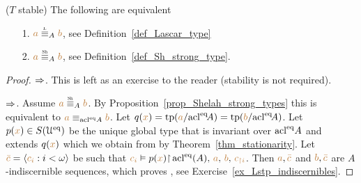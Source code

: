 \begin{corollary}
($T$ stable)
The following are equivalent
\begin{itemize}
\item[1.] ${\mr a}\equivL_A{\mr b}$, see Definition~\ref{def_Lascar_type}
\item[2.] ${\mr a}\equivSh_A{\mr b}$, see Definition~\ref{def_Sh_strong_type}.
\end{itemize}
\end{corollary}
\begin{proof}$\Rightarrow$.
  This is left as an exercise to the reader (stability is not required).

  $\Rightarrow$.
  Assume ${\mr a}\equivSh_A{\mr b}$.
  By Proposition~\ref{prop_Shelah_strong_types} this is equivalent to ${\color{brown} a}\equiv_{\mathop{\rm acl}^{{\rm eq}}\!A}{\color{brown} b}$.
  Let $q({\color{brown} x})={\rm tp}({\color{brown} a}/{\mathop{\rm acl}}^{{\rm eq}}\!A)={\rm tp}({\color{brown} b}/{\mathop{\rm acl}}^{{\rm eq}}\!A)$. Let $p({\color{brown} x})\in S(\EuScript U^{{\rm eq}})$ be the unique global type that is invariant over $\mathop{\rm acl}^{{\rm eq}}\!A$ and extends $q({\color{brown} x})$ which we obtain from by Theorem~\ref{thm_stationarity}.
  Let ${\color{brown}\bar c}=\langle{\color{brown}c_i}:i<\omega\rangle$ be such that ${\color{brown} c_i}\vDash p({\color{brown} x}){\restriction}\mathop{\rm acl}^{{\rm eq}}(A),\,{\color{brown} a},\,{\color{brown} b},\,{\color{brown} c_{\restriction i}}$.
  Then ${\color{brown} a},{\color{brown}\bar c}$ and ${\color{brown} b},{\color{brown}\bar c}$ are $A$-indiscernible sequences, which proves , see Exercise~\ref{ex_Lstp_indiscernibles}.
\end{proof}



